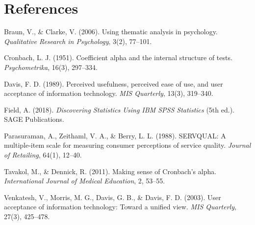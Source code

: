\documentclass[12pt,a4paper]{article}
\begin{document}
\newpage

\section*{References}

\begin{enumerate}[leftmargin=1.5em,itemsep=3pt,label={[\arabic*]}]
    \item Braun, V., \& Clarke, V. (2006). Using thematic analysis in psychology. \textit{Qualitative Research in Psychology}, 3(2), 77--101.
    \item Cronbach, L. J. (1951). Coefficient alpha and the internal structure of tests. \textit{Psychometrika}, 16(3), 297--334.
    \item Davis, F. D. (1989). Perceived usefulness, perceived ease of use, and user acceptance of information technology. \textit{MIS Quarterly}, 13(3), 319--340.
    \item Field, A. (2018). \textit{Discovering Statistics Using IBM SPSS Statistics} (5th ed.). SAGE Publications.
    \item Parasuraman, A., Zeithaml, V. A., \& Berry, L. L. (1988). SERVQUAL: A multiple-item scale for measuring consumer perceptions of service quality. \textit{Journal of Retailing}, 64(1), 12--40.
    \item Tavakol, M., \& Dennick, R. (2011). Making sense of Cronbach's alpha. \textit{International Journal of Medical Education}, 2, 53--55.
    \item Venkatesh, V., Morris, M. G., Davis, G. B., \& Davis, F. D. (2003). User acceptance of information technology: Toward a unified view. \textit{MIS Quarterly}, 27(3), 425--478.
\end{enumerate}
\end{document}
